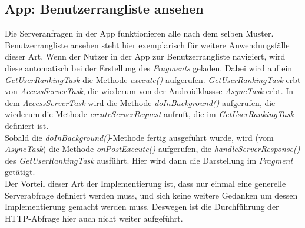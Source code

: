 \subsection{App: Benutzerrangliste ansehen}
Die Serveranfragen in der App funktionieren alle nach dem selben Muster. Benutzerrangliste ansehen steht hier exemplarisch für weitere Anwendungsfälle dieser Art.
Wenn der Nutzer in der App zur Benutzerrangliste navigiert, wird diese automatisch bei der Erstellung des \emph{Fragments} geladen. Dabei wird auf ein \emph{GetUserRankingTask} die Methode \emph{execute()} aufgerufen. \emph{GetUserRankingTask} erbt von \emph{AccessServerTask}, die wiederum von der Androidklassse \emph{AsyncTask} erbt. In dem \emph{AccessServerTask} wird die Methode \emph{doInBackground()} aufgerufen, die wiederum die Methode \emph{createServerRequest} aufruft, die im \emph{GetUserRankingTask} definiert ist.\\
Sobald die \emph{doInBackground()}-Methode fertig ausgeführt wurde, wird (vom \emph{AsyncTask}) die Methode \emph{onPostExecute()} aufgerufen, die \emph{handleServerResponse()} des \emph{GetUserRankingTask} ausführt. Hier wird dann die Darstellung im \emph{Fragment} getätigt.\\
Der Vorteil dieser Art der Implementierung ist, dass nur einmal eine generelle Serverabfrage definiert werden muss, und sich keine weitere Gedanken um dessen Implementierung gemacht werden muss. Deswegen ist die Durchführung der HTTP-Abfrage hier auch nicht weiter aufgeführt.